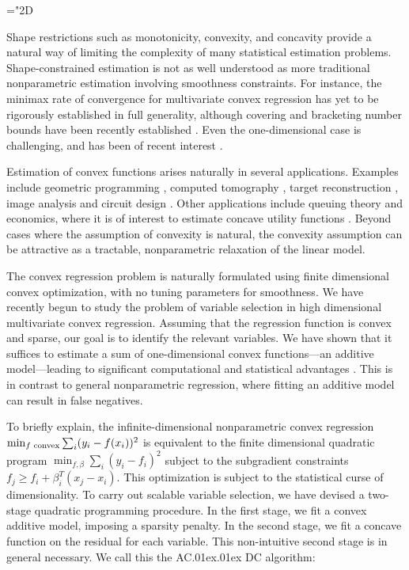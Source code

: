 \def\argmin{\mathop{\text{\rm arg\,min}}}
\mathchardef\mh="2D
\def\ACDC{AC\kern.01ex\Lightning\kern.01ex DC}

\label{sec:aim3}
\vskip-10pt \background{} Shape restrictions such as monotonicity,
convexity, and concavity provide a natural way of limiting the
complexity of many statistical estimation problems.  Shape-constrained
estimation is not as well understood as more traditional nonparametric
estimation involving smoothness constraints.  For instance, the
minimax rate of convergence for multivariate convex regression has yet
to be rigorously established in full generality, although covering and
bracketing number bounds have been recently established
\citep{kim2014global}.  Even the one-dimensional case is challenging,
and has been of recent interest \citep{guntusen:13}.

Estimation of convex functions arises naturally in several
applications.  Examples include geometric programming \citep{Boyd04},
computed tomography \citep{Prince:90}, target reconstruction
\citep{Lele:92}, image analysis \citep{Golden:06} and circuit design
\citep{Hannah:12}.  Other applications include queuing theory
\citep{Chen:01} and economics, where it is of interest to estimate
concave utility functions \citep{Pratt:68}.  
Beyond cases where the assumption of convexity is
natural, the convexity assumption can be attractive as a
tractable, nonparametric relaxation of the linear model.  

The convex regression problem is naturally
formulated using finite dimensional convex optimization, with no
tuning parameters for smoothness.  
We have recently begun to study the problem of variable selection in
high dimensional multivariate convex regression.  Assuming that the regression function
is convex and sparse, our goal is to identify the relevant variables.
We have shown that it suffices to estimate a sum of one-dimensional convex
functions---an additive model---leading to significant computational and statistical
advantages \citep{xu:14}.  This is in contrast to general nonparametric regression,
where fitting an additive model can result in false negatives.

To briefly explain, the infinite-dimensional nonparametric convex regression
$ \min_{\mbox{\scriptsize $f$ convex}} \sum_i (y_i - f(x_i))^2$
is equivalent to the finite dimensional quadratic program
$\min_{f,\beta} \sum_i (y_i - f_i)^2$ subject to the
subgradient constraints $f_j \geq f_i + \beta_i^T (x_j - x_i) $.
This optimization is subject to the statistical curse of dimensionality.
To carry out scalable variable selection, we
have devised a two-stage quadratic programming procedure.  In
the first stage, we fit a convex additive model, imposing a sparsity
penalty.  In the second stage, we fit a concave function on the
residual for each variable.  This non-intuitive second
stage is in general necessary.   We call this the \ACDC{} algorithm:
\def\C{{\mathcal C}}

